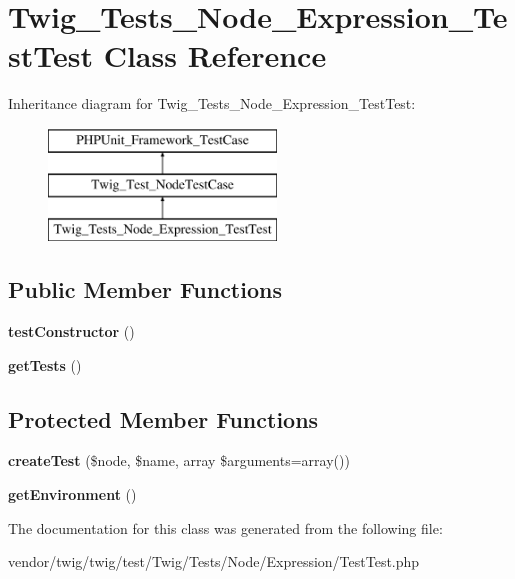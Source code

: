 \hypertarget{classTwig__Tests__Node__Expression__TestTest}{}\section{Twig\+\_\+\+Tests\+\_\+\+Node\+\_\+\+Expression\+\_\+\+Test\+Test Class Reference}
\label{classTwig__Tests__Node__Expression__TestTest}
Inheritance diagram for Twig\+\_\+\+Tests\+\_\+\+Node\+\_\+\+Expression\+\_\+\+Test\+Test\+:\begin{figure}[H]
\begin{center}
\leavevmode
\includegraphics[height=3.000000cm]{classTwig__Tests__Node__Expression__TestTest}
\end{center}
\end{figure}
\subsection*{Public Member Functions}
\begin{DoxyCompactItemize}
\item 
{\bfseries test\+Constructor} ()\hypertarget{classTwig__Tests__Node__Expression__TestTest_afc8a0247e72541ff6d8b2c4742d0b974}{}\label{classTwig__Tests__Node__Expression__TestTest_afc8a0247e72541ff6d8b2c4742d0b974}

\item 
{\bfseries get\+Tests} ()\hypertarget{classTwig__Tests__Node__Expression__TestTest_a67654ac7979b724cc3588f4e9d06880f}{}\label{classTwig__Tests__Node__Expression__TestTest_a67654ac7979b724cc3588f4e9d06880f}

\end{DoxyCompactItemize}
\subsection*{Protected Member Functions}
\begin{DoxyCompactItemize}
\item 
{\bfseries create\+Test} (\$node, \$name, array \$arguments=array())\hypertarget{classTwig__Tests__Node__Expression__TestTest_a213f6195734cf020cefe16e2795a8b85}{}\label{classTwig__Tests__Node__Expression__TestTest_a213f6195734cf020cefe16e2795a8b85}

\item 
{\bfseries get\+Environment} ()\hypertarget{classTwig__Tests__Node__Expression__TestTest_a0b1212bb393fcaeb538cbede7046ad95}{}\label{classTwig__Tests__Node__Expression__TestTest_a0b1212bb393fcaeb538cbede7046ad95}

\end{DoxyCompactItemize}


The documentation for this class was generated from the following file\+:\begin{DoxyCompactItemize}
\item 
vendor/twig/twig/test/\+Twig/\+Tests/\+Node/\+Expression/Test\+Test.\+php\end{DoxyCompactItemize}
